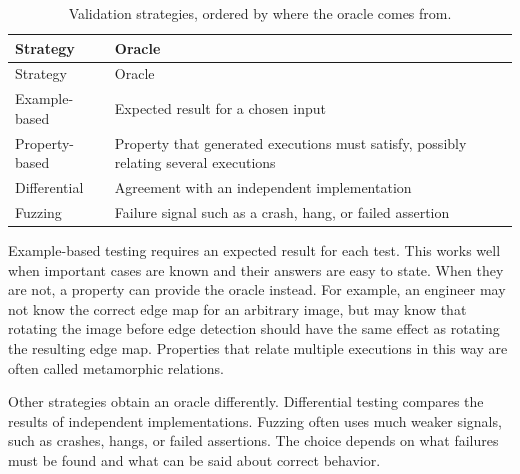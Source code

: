 \begin{longtable}[]{@{}
  >{\raggedright\arraybackslash}p{}
  >{\raggedright\arraybackslash}p{}@{}}
\caption{Validation strategies, ordered by where the oracle comes from.}\label{tbl-validation-strategies}\tabularnewline
\toprule\noalign{}
\begin{minipage}[b]{\linewidth}\raggedright
Strategy
\end{minipage} & \begin{minipage}[b]{\linewidth}\raggedright
Oracle
\end{minipage} \\
\midrule\noalign{}
\endfirsthead
\toprule\noalign{}
\begin{minipage}[b]{\linewidth}\raggedright
Strategy
\end{minipage} & \begin{minipage}[b]{\linewidth}\raggedright
Oracle
\end{minipage} \\
\midrule\noalign{}
\endhead
\bottomrule\noalign{}
\endlastfoot
Example-based & Expected result for a chosen input \\
Property-based & Property that generated executions must satisfy, possibly relating several executions \\
Differential & Agreement with an independent implementation \\
Fuzzing & Failure signal such as a crash, hang, or failed assertion \\
\end{longtable}

Example-based testing requires an expected result for each test. This works well when important
cases are known and their answers are easy to state. When they are not, a property can provide the
oracle instead. For example, an engineer may not know the correct edge map for an arbitrary image,
but may know that rotating the image before edge detection should have the same effect as rotating
the resulting edge map. Properties that relate multiple executions in this way are often called
metamorphic relations.

Other strategies obtain an oracle differently. Differential testing compares the results of
independent implementations. Fuzzing often uses much weaker signals, such as crashes, hangs, or
failed assertions. The choice depends on what failures must be found and what can be said about
correct behavior.

